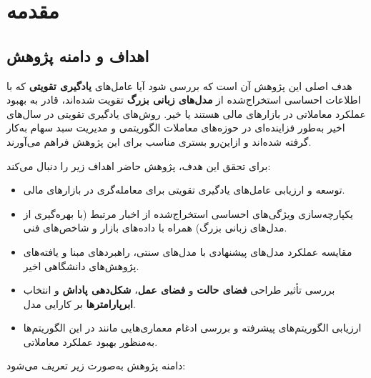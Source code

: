 \documentclass[12pt, a4paper]{report}
\begin{document}
\chapter{مقدمه}

\section{اهداف و دامنه پژوهش}

هدف اصلی این پژوهش آن است که بررسی شود آیا عامل‌های \textbf{یادگیری تقویتی} که با اطلاعات احساسی استخراج‌شده از \textbf{مدل‌های زبانی بزرگ} تقویت شده‌اند، قادر به بهبود عملکرد معاملاتی در بازارهای مالی هستند یا خیر.  
روش‌های یادگیری تقویتی در سال‌های اخیر به‌طور فزاینده‌ای در حوزه‌های معاملات الگوریتمی و مدیریت سبد سهام به‌کار گرفته شده‌اند \cite{pricope2021deep} و ازاین‌رو بستری مناسب برای این پژوهش فراهم می‌آورند. 

برای تحقق این هدف، پژوهش حاضر اهداف زیر را دنبال می‌کند:

\begin{itemize}
    \item توسعه و ارزیابی عامل‌های یادگیری تقویتی برای معامله‌گری در بازارهای مالی.
\item یکپارچه‌سازی ویژگی‌های احساسی استخراج‌شده از اخبار مرتبط (با بهره‌گیری از مدل‌های زبانی بزرگ) همراه با داده‌های بازار و شاخص‌های فنی.

\item مقایسه عملکرد مدل‌های پیشنهادی با مدل‌های سنتی، راهبردهای مبنا و یافته‌های پژوهش‌های دانشگاهی اخیر.
\item بررسی تأثیر طراحی \textbf{فضای حالت} و \textbf{فضای عمل}، \textbf{شکل‌دهی پاداش} و انتخاب \textbf{ابرپارامترها} بر کارایی مدل.
\item ارزیابی الگوریتم‌های پیشرفته و بررسی ادغام معماری‌هایی مانند  در این الگوریتم‌ها به‌منظور بهبود عملکرد معاملاتی.
\end{itemize}

دامنه پژوهش به‌صورت زیر تعریف می‌شود:
\end{document}
